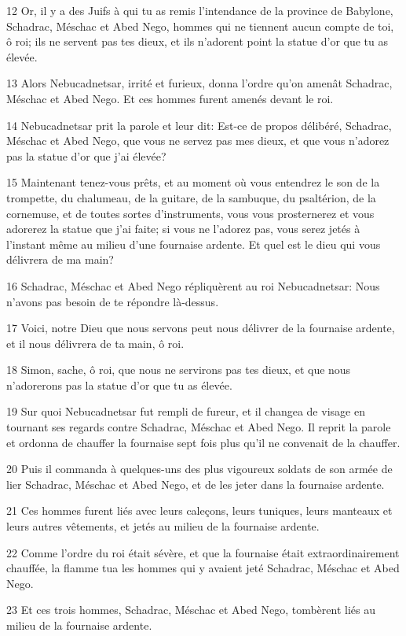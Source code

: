\par 12 Or, il y a des Juifs à qui tu as remis l'intendance de la province de Babylone, Schadrac, Méschac et Abed Nego, hommes qui ne tiennent aucun compte de toi, ô roi; ils ne servent pas tes dieux, et ils n'adorent point la statue d'or que tu as élevée.
\par 13 Alors Nebucadnetsar, irrité et furieux, donna l'ordre qu'on amenât Schadrac, Méschac et Abed Nego. Et ces hommes furent amenés devant le roi.
\par 14 Nebucadnetsar prit la parole et leur dit: Est-ce de propos délibéré, Schadrac, Méschac et Abed Nego, que vous ne servez pas mes dieux, et que vous n'adorez pas la statue d'or que j'ai élevée?
\par 15 Maintenant tenez-vous prêts, et au moment où vous entendrez le son de la trompette, du chalumeau, de la guitare, de la sambuque, du psaltérion, de la cornemuse, et de toutes sortes d'instruments, vous vous prosternerez et vous adorerez la statue que j'ai faite; si vous ne l'adorez pas, vous serez jetés à l'instant même au milieu d'une fournaise ardente. Et quel est le dieu qui vous délivrera de ma main?
\par 16 Schadrac, Méschac et Abed Nego répliquèrent au roi Nebucadnetsar: Nous n'avons pas besoin de te répondre là-dessus.
\par 17 Voici, notre Dieu que nous servons peut nous délivrer de la fournaise ardente, et il nous délivrera de ta main, ô roi.
\par 18 Simon, sache, ô roi, que nous ne servirons pas tes dieux, et que nous n'adorerons pas la statue d'or que tu as élevée.
\par 19 Sur quoi Nebucadnetsar fut rempli de fureur, et il changea de visage en tournant ses regards contre Schadrac, Méschac et Abed Nego. Il reprit la parole et ordonna de chauffer la fournaise sept fois plus qu'il ne convenait de la chauffer.
\par 20 Puis il commanda à quelques-uns des plus vigoureux soldats de son armée de lier Schadrac, Méschac et Abed Nego, et de les jeter dans la fournaise ardente.
\par 21 Ces hommes furent liés avec leurs caleçons, leurs tuniques, leurs manteaux et leurs autres vêtements, et jetés au milieu de la fournaise ardente.
\par 22 Comme l'ordre du roi était sévère, et que la fournaise était extraordinairement chauffée, la flamme tua les hommes qui y avaient jeté Schadrac, Méschac et Abed Nego.
\par 23 Et ces trois hommes, Schadrac, Méschac et Abed Nego, tombèrent liés au milieu de la fournaise ardente.
